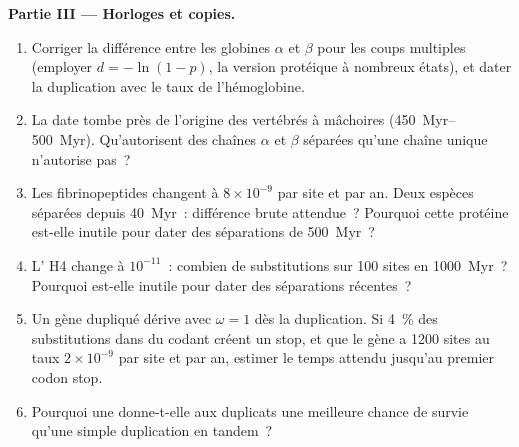 \begin{problem}
\medskip
\noindent\textbf{Partie III --- Horloges et copies.}
\begin{enumerate}[resume]
  \item Corriger la différence entre les globines $\alpha$ et $\beta$
        pour les coups multiples (employer $d = -\ln(1 - p)$, la version
        protéique à nombreux états), et dater la duplication avec le taux
        de l'hémoglobine.
  \item La date tombe près de l'origine des vertébrés à mâchoires
        (\qtyrange{450}{500}{Myr}). Qu'autorisent des chaînes $\alpha$ et
        $\beta$ séparées qu'une chaîne unique n'autorise pas~?
  \item Les fibrinopeptides changent à $8\times 10^{-9}$ par site et par
        an. Deux espèces séparées depuis \qty{40}{Myr}~: différence brute
        attendue~? Pourquoi cette protéine est-elle inutile pour dater
        des séparations de \qty{500}{Myr}~?
  \item L' H4 change à $10^{-11}$~: combien de substitutions sur
        100 sites en \qty{1000}{Myr}~? Pourquoi est-elle inutile pour
        dater des séparations récentes~?
  \item Un gène dupliqué dérive avec $\omega = 1$ dès la duplication. Si
        \qty{4}{\%} des substitutions dans du codant créent un stop, et
        que le gène a 1200 sites au taux $2\times
        10^{-9}$ par site et par an, estimer le temps attendu jusqu'au
        premier codon stop.
  \item Pourquoi une  donne-t-elle aux
        duplicats une meilleure chance de survie qu'une simple
        duplication en tandem~?
\end{enumerate}


\end{problem}
